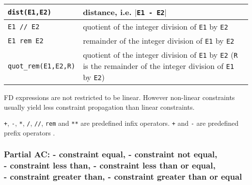 \begin{tabular}{|l|L{10cm}|}
\texttt{dist(E1,E2)} & distance, i.e. $|$\texttt{E1 - E2$|$} \\

\hline

\texttt{E1 // E2} & quotient of the integer division of \texttt{E1} by
\texttt{E2} \\

\hline

\texttt{E1 rem E2} & remainder of the integer division of \texttt{E1} by
\texttt{E2} \\

\hline

\texttt{quot\_rem(E1,E2,R)} & quotient of the integer division of
\texttt{E1} by \texttt{E2}
  \linebreak
   (\texttt{R} is the remainder of the integer division of \texttt{E1} by
   \texttt{E2}) \\

\hline
\end{tabular}

FD expressions are not restricted to be linear. However non-linear
constraints usually yield less constraint propagation than linear
constraints.

\texttt{+}, \texttt{-}, \texttt{*}, \texttt{/}, \texttt{//}, \texttt{rem}
and \texttt{**} are predefined infix operators. \texttt{+} and \texttt{-}
are predefined prefix operators .

\begin{PlErrors}




\end{PlErrors}

\subsubsection{Partial AC:  - constraint equal, \label{Partial-AC:-(:=)/2}
                - constraint not equal, \\
                - constraint less than,
                - constraint less than or equal, \\
                - constraint greater than,
                - constraint greater than or equal}

